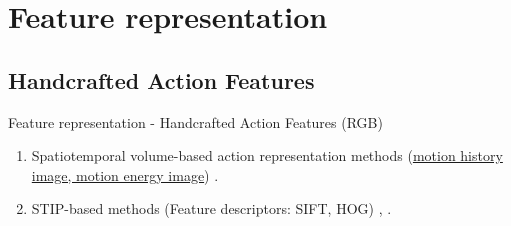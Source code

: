 \section{Feature representation}
\subsection{Handcrafted Action Features}
\begin{frame}{Feature representation - Handcrafted Action Features (RGB)}
    \begin{enumerate}
        \item<1-> Spatiotemporal volume-based action representation methods (\href{https://web.cse.ohio-state.edu/~davis.1719/CVL/Research/MHI/mhi.html}{motion history image, motion energy image}) \cite{li2011human}.
        \item<2-> STIP-based methods (Feature descriptors: SIFT, HOG) \cite{nguyen2014stap}, \cite{dalal2005histograms}.
\end{enumerate}
\end{frame}
